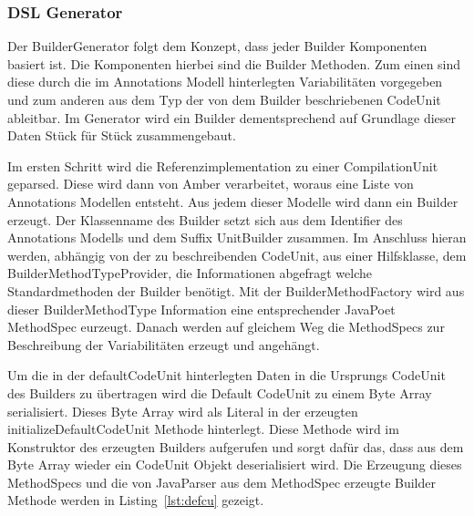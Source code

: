 \documentclass[12pt,oneside,a4paper,parskip]{scrbook}
\begin{document}
\subsubsection{DSL Generator}

Der BuilderGenerator folgt dem Konzept, dass jeder Builder Komponenten basiert ist. Die Komponenten hierbei sind die Builder Methoden. Zum einen sind diese durch die im Annotations Modell hinterlegten Variabilitäten vorgegeben und zum anderen aus dem Typ der von dem Builder beschriebenen CodeUnit ableitbar. Im Generator wird ein Builder dementsprechend auf Grundlage dieser Daten Stück für Stück zusammengebaut.

Im ersten Schritt wird die Referenzimplementation zu einer CompilationUnit geparsed. Diese wird dann von Amber verarbeitet, woraus eine Liste von Annotations Modellen entsteht. Aus jedem dieser Modelle wird dann ein Builder erzeugt. Der Klassenname des Builder setzt sich aus dem Identifier des Annotations Modells und dem Suffix UnitBuilder zusammen. Im Anschluss hieran werden, abhängig von der zu beschreibenden CodeUnit, aus einer Hilfsklasse, dem BuilderMethodTypeProvider, die Informationen abgefragt welche Standardmethoden der Builder benötigt. Mit der BuilderMethodFactory wird aus dieser BuilderMethodType Information eine entsprechender JavaPoet MethodSpec eurzeugt. Danach werden auf gleichem Weg die MethodSpecs zur Beschreibung der Variabilitäten erzeugt und angehängt.

Um die in der defaultCodeUnit hinterlegten Daten in die Ursprungs CodeUnit des Builders zu übertragen wird die Default CodeUnit zu einem Byte Array serialisiert. Dieses Byte Array wird als Literal in der erzeugten initializeDefaultCodeUnit Methode hinterlegt. Diese Methode wird im Konstruktor des erzeugten Builders aufgerufen und sorgt dafür das, dass aus dem Byte Array wieder ein CodeUnit Objekt deserialisiert wird. Die Erzeugung dieses MethodSpecs und die von JavaParser aus dem MethodSpec erzeugte Builder Methode werden in Listing~\ref{lst:defcu} gezeigt.
\end{document}
